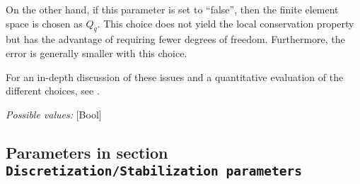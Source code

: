 \begin{itemize}
On the other hand, if this parameter is set to ``false'', then the finite element space is chosen as $Q_q$. This choice does not yield the local conservation property but has the advantage of requiring fewer degrees of freedom. Furthermore, the error is generally smaller with this choice.

For an in-depth discussion of these issues and a quantitative evaluation of the different choices, see \cite {KHB12} .


{\it Possible values:} [Bool]
\end{itemize}



\subsection{Parameters in section \tt Discretization/Stabilization parameters}
\label{parameters:Discretization/Stabilization_20parameters}

